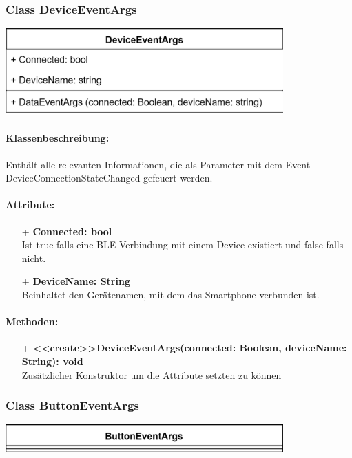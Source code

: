 \documentclass[a4paper,12pt]{article}
\begin{document}
\begin{minipage}[b]{0.5\textwidth}
	\subsubsection{Class DeviceEventArgs}
	
	\end{minipage}
	\begin{minipage}[c]{0.5\textwidth}
	\includegraphics[width=0.8\textwidth]{bilder/BibPackageKlassen/DeviceEventArgs.png}
\end{minipage}
\paragraph{Klassenbeschreibung:}
Enthält alle relevanten Informationen, die als Parameter mit dem Event DeviceConnectionStateChanged gefeuert werden.

\paragraph{Attribute:}
\begin{itemize}
	\item[+] \textbf{Connected: bool}\\Ist true falls eine BLE Verbindung mit einem Device existiert und false falls nicht.
	\item[+] \textbf{DeviceName: String}\\Beinhaltet den Gerätenamen, mit dem das Smartphone verbunden ist. 
\end{itemize}

\paragraph{Methoden:}
\begin{itemize}
	\item[+] \textbf{<<create>>DeviceEventArgs(connected: Boolean, deviceName: String): void}\\ Zusätzlicher Konstruktor um die Attribute setzten zu können
\end{itemize}


\begin{minipage}[b]{0.5\textwidth}
	\subsubsection{Class ButtonEventArgs}
	
	\end{minipage}
	\begin{minipage}[c]{0.5\textwidth}
	\includegraphics[width=0.8\textwidth]{bilder/BibPackageKlassen/ButtonEventArgs.png}
\end{minipage}
\end{document}
